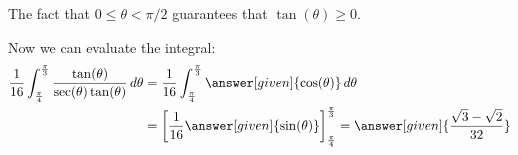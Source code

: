 \documentclass{ximera}
\begin{document}
\begin{example}
\begin{explanation}
The fact that $0\leq \theta < \pi/2$ guarantees that $\tan(\theta) \geq 0$. 
 
   Now we can evaluate the integral:
    \begin{align*}
     \frac{1}{16}\int_{\frac{\pi}{4}}^{\frac{\pi}{3}} \frac{\tan(\theta)}{\sec(\theta) \tan(\theta)}  \d \theta &= \frac{1}{16} \int_{\frac{\pi}{4}}^{\frac{\pi}{3}} \answer[given]{\cos(\theta)}  \d \theta\\
      &= \eval{\frac{1}{16}\answer[given]{\sin(\theta)}}_{\frac{\pi}{4}}^{\frac{\pi}{3}}= \answer[given]{\frac{\sqrt{3}-\sqrt{2}}{32}}
         \end{align*}




\end{explanation}
\end{example}
\end{document}
